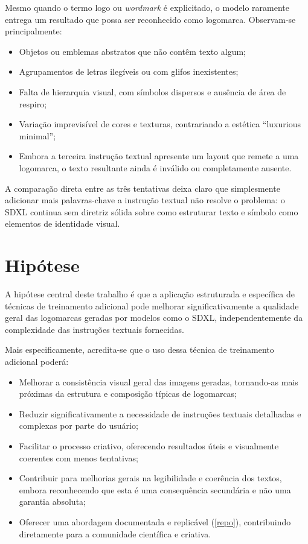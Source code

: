 \documentclass[12pt, %
openright, 
oneside, %
a4paper,    %
brazil]{facom-ufu-abntex2}
\begin{document}
Mesmo quando o termo logo ou \emph{wordmark} é explicitado, o modelo raramente entrega um resultado que possa ser reconhecido como logomarca. Observam-se principalmente:

\begin{itemize}
    \item Objetos ou emblemas abstratos que não contêm texto algum;
    \item Agrupamentos de letras ilegíveis ou com glifos inexistentes;
    \item Falta de hierarquia visual, com símbolos dispersos e ausência de área de respiro;
    \item Variação imprevisível de cores e texturas, contrariando a estética ``luxurious minimal'';
    \item Embora a terceira instrução textual apresente um layout que remete a uma logomarca, o texto resultante ainda é inválido ou completamente ausente.
\end{itemize}

A comparação direta entre as três tentativas deixa claro que simplesmente adicionar mais palavras-chave a instrução textual não resolve o problema: o SDXL continua sem diretriz sólida sobre como estruturar texto e símbolo como elementos de identidade visual.

\section{Hipótese}

A hipótese central deste trabalho é que a aplicação estruturada e específica de técnicas de treinamento adicional pode melhorar significativamente a qualidade geral das logomarcas geradas por modelos como o SDXL, independentemente da complexidade das instruções textuais fornecidas.

Mais especificamente, acredita-se que o uso dessa técnica de treinamento adicional poderá:

\begin{itemize}
    \item Melhorar a consistência visual geral das imagens geradas, tornando-as mais próximas da estrutura e composição típicas de logomarcas;
    \item Reduzir significativamente a necessidade de instruções textuais detalhadas e complexas por parte do usuário;
    \item Facilitar o processo criativo, oferecendo resultados úteis e visualmente coerentes com menos tentativas;
    \item Contribuir para melhorias gerais na legibilidade e coerência dos textos, embora reconhecendo que esta é uma consequência secundária e não uma garantia absoluta;
    \item Oferecer uma abordagem documentada e replicável (\ref{repo}), contribuindo diretamente para a comunidade científica e criativa.
\end{itemize}
\end{document}
